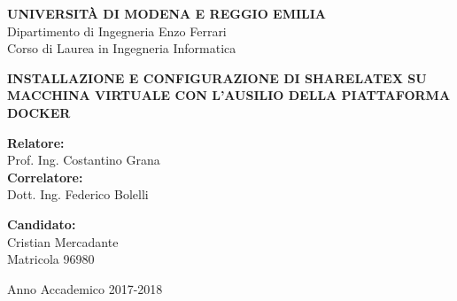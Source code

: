 \thispagestyle{empty}
\vspace*{-1. cm}
\begin{center}
  \Large
  \textbf{UNIVERSIT\`A DI MODENA E REGGIO EMILIA}\\
  
  \vspace{0.25 cm}
  \Large
  Dipartimento di Ingegneria Enzo Ferrari\\
  Corso di Laurea in Ingegneria Informatica\\
  \vspace*{5. cm} \LARGE

  \textbf{INSTALLAZIONE E CONFIGURAZIONE DI SHARELATEX SU MACCHINA VIRTUALE CON L'AUSILIO DELLA PIATTAFORMA DOCKER}\\
  
\end{center}

\vspace*{2.5 cm}
\Large

\begin{flushleft}
  \textbf{Relatore:}\\
  Prof. Ing. Costantino Grana\\
  \vspace*{0.25 cm}
  \textbf{Correlatore:}\\
  Dott. Ing. Federico Bolelli 
\end{flushleft}

\vspace*{0.5 cm}

\begin{flushright}
  \textbf{Candidato:}\\
  Cristian Mercadante\\
  Matricola 96980
\end{flushright}

\vspace*{3 cm}

\begin{center}
  Anno Accademico 2017-2018
\end{center} \clearpage
\normalsize

